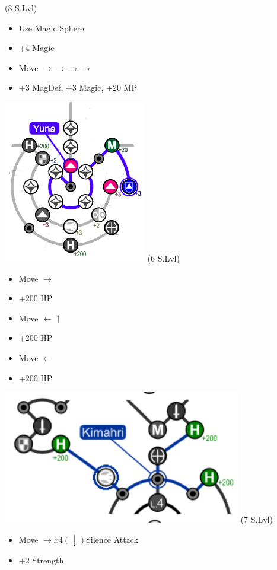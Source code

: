 \vfill
\begin{spheregrid}
	\begin{itemize}
		\yunaf (8 S.Lvl)
		\begin{itemize}
			\item Use Magic Sphere
			\item +4 Magic
			\item Move $\rightarrow\rightarrow\rightarrow\rightarrow$
			\item +3 MagDef, +3 Magic, +20 MP
		\end{itemize}
		\includegraphics{graphics/Yuna_MRR_1}
		\kimahrif (6 S.Lvl)
		\begin{itemize}
			\item Move $\rightarrow$
			\item +200 HP
			\item Move $\leftarrow\uparrow$
			\item +200 HP
			\item Move $\leftarrow$
			\item +200 HP
		\end{itemize}
		\includegraphics{graphics/kimahrimmr}
		\wakkaf (7 S.Lvl)
		\begin{itemize}
			\item Move $\rightarrow x4 (\downarrow)$Silence Attack
			\item +2 Strength

\end{itemize}
\end{itemize}
\end{spheregrid}
